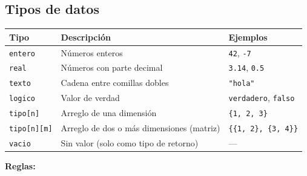 \documentclass[spanish,11pt,letterpaper]{article}
\begin{document}
	\subsection{Tipos de datos}
	\begin{center}
		\begin{tabular}{@{}lll@{}}
			\toprule
			\textbf{Tipo} & \textbf{Descripci\'on} & \textbf{Ejemplos} \\
			\midrule
			\texttt{entero} & N\'umeros enteros & \texttt{42}, \texttt{-7} \\
			\texttt{real} & N\'umeros con parte decimal & \texttt{3.14}, \texttt{0.5} \\
			\texttt{texto} & Cadena entre comillas dobles & \texttt{"hola"} \\
			\texttt{logico} & Valor de verdad & \texttt{verdadero}, \texttt{falso} \\
			\texttt{tipo[n]} & Arreglo de una dimensi\'on & \texttt{\{1, 2, 3\}} \\
			\texttt{tipo[n][m]} & Arreglo de dos o m\'as dimensiones (matriz) & \texttt{\{\{1, 2\}, \{3, 4\}\}} \\
			\texttt{vacio} & Sin valor (solo como tipo de retorno) & --- \\
			\bottomrule
		\end{tabular}
	\end{center}
	
	\textbf{Reglas:}
	\smallskip
	
\end{document}
